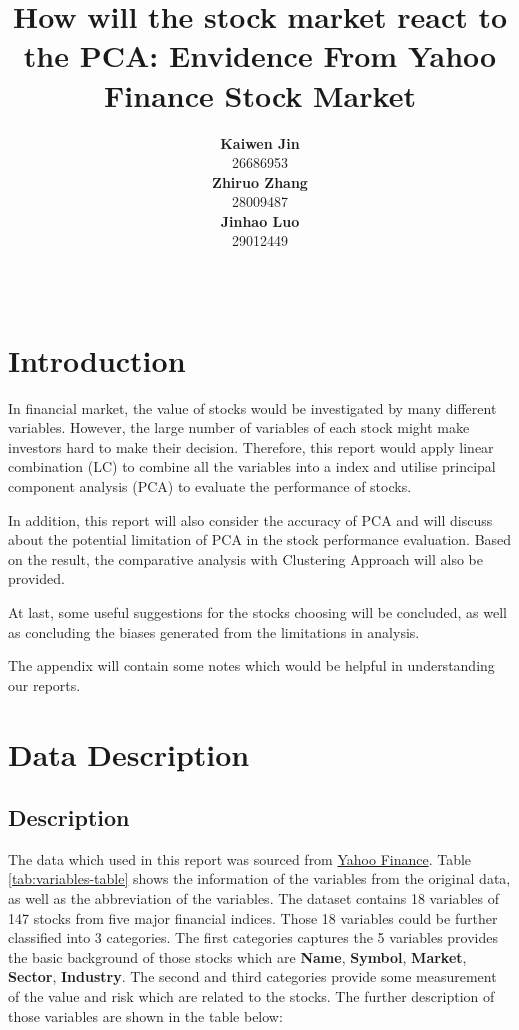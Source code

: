 \documentclass[11pt,a4paper,]{article}
\title{How will the stock market react to the PCA: Envidence From Yahoo Finance Stock Market}
\author{\sf\Large\textbf{ Kaiwen Jin}\\ {\sf\large 26686953\\[0.5cm]} \sf\Large\textbf{ Zhiruo Zhang}\\ {\sf\large 28009487\\[0.5cm]} \sf\Large\textbf{ Jinhao Luo}\\ {\sf\large 29012449\\[0.5cm]}}
\date{\sf\Date~\Month~\Year}
\makeatletter
\def\titlepage{\front{\expandafter{\@title}}{\@author}{\@organization}}
\makeatother
\begin{document}
\titlepage

{
\setcounter{tocdepth}{2}
\tableofcontents
}
\clearpage

\hypertarget{introduction}{%
\section{Introduction}\label{introduction}}

In financial market, the value of stocks would be investigated by many different variables. However, the large number of variables of each stock might make investors hard to make their decision. Therefore, this report would apply linear combination (LC) to combine all the variables into a index and utilise principal component analysis (PCA) to evaluate the performance of stocks.

In addition, this report will also consider the accuracy of PCA and will discuss about the potential limitation of PCA in the stock performance evaluation. Based on the result, the comparative analysis with Clustering Approach will also be provided.

At last, some useful suggestions for the stocks choosing will be concluded, as well as concluding the biases generated from the limitations in analysis.

The appendix will contain some notes which would be helpful in understanding our reports.

\hypertarget{data-description}{%
\section{Data Description}\label{data-description}}

\hypertarget{description}{%
\subsection{Description}\label{description}}

The data which used in this report was sourced from \href{https://au.finance.yahoo.com/}{Yahoo Finance}. Table \ref{tab:variables-table} shows the information of the variables from the original data, as well as the abbreviation of the variables. The dataset contains 18 variables of 147 stocks from five major financial indices. Those 18 variables could be further classified into 3 categories. The first categories captures the 5 variables provides the basic background of those stocks which are \textbf{Name}, \textbf{Symbol}, \textbf{Market}, \textbf{Sector}, \textbf{Industry}. The second and third categories provide some measurement of the value and risk which are related to the stocks. The further description of those variables are shown in the table below:
\end{document}
